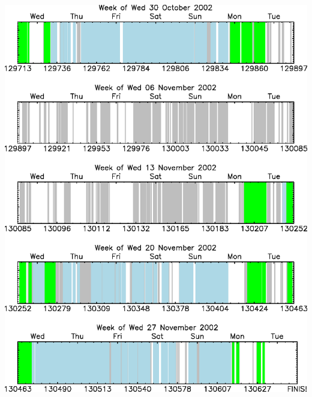 \documentclass[12pt]{article}
\begin{document}
\mbox{ } \vfill \includegraphics[width=\linewidth]{fits2_dates11.eps} \vfill \mbox{ } \pagebreak
\end{document}
